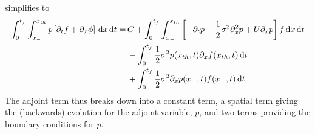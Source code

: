 \documentclass{article}
\def \tf {{t_f}}
\begin{document}
  simplifies to 
\begin{align*}
\int_0^{\tf} \int_{x_-}^{\xth}
p  \left[\di_t f  + \di_x \phi\right]
	\intd{x}\intd{t} 
= & \, C+
\int_0^{\tf}\int_{x_-}^{\xth} 
	\left[-\di_tp -  \frac{1 }{2}\s^2\di^2_xp + U \di_xp \right]  f
\intd{x}\intd{t}
\\ 
& \, - \int_{0}^{\tf} \frac{1 }{2}\s^2 p(\xth,t)  \di_xf(\xth,t) \intd{t}
\\
& \, + \int_{0}^{\tf} \frac{1 }{2}\s^2\di_xp(x_-,t)  f(x_-,t) \intd{t}.
\end{align*}
The adjoint term thus breaks down into a constant term, a spatial
term giving the (backwards) evolution for the adjoint variable, $p$,
and two terms providing the boundary conditions for $p$. 
\end{document}
